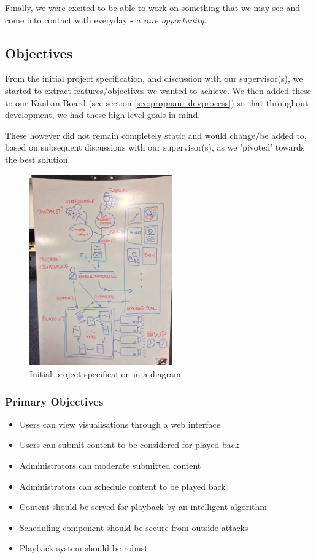 \documentclass[a4paper, titlepage]{article}
\begin{document}
Finally, we were excited to be able to work on something that we may see and come into contact with everyday - \textit{a rare opportunity}.

\subsection{Objectives} \label{sec:intro_objectives}

From the initial project specification, and discussion with our supervisor(s), we started to extract features/objectives we wanted to achieve. We then added these to our Kanban Board (see section \ref{sec:projman_devprocess}) so that throughout development, we had these high-level goals in mind. 

These however did not remain completely static and would change/be added to, based on subsequent discussions with our supervisor(s), as we 'pivoted' towards the best solution.

\begin{figure}[h]
  \centering
    \includegraphics[width = 0.55\textwidth, trim = 0 0 0 1cm, clip]{./intro/userreq.jpg}
  \caption{Initial project specification in a diagram}
  \label{fig:intro_userreq}
\end{figure}

\subsubsection{Primary Objectives} \label{sec:primary_objectives}
\begin{itemize}
\item Users can view visualisations through a web interface
\item Users can submit content to be considered for played back
\item Administrators can moderate submitted content
\item Administrators can schedule content to be played back
\item Content should be served for playback by an intelligent algorithm
\item Scheduling component should be secure from outside attacks
\item Playback system should be robust
\end{itemize}
\end{document}
